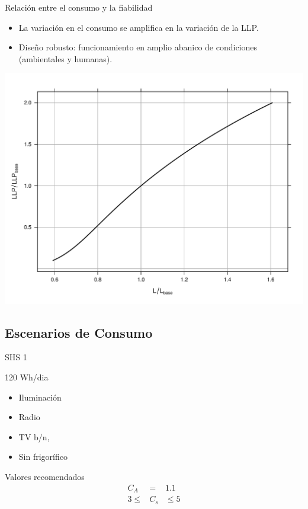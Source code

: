 \documentclass[xcolor={usenames,svgnames,dvipsnames}]{beamer}
\begin{document}
\begin{frame}[label={sec:orgadb8b8d}]{Relación entre el consumo y la fiabilidad}
\begin{itemize}
\item La variación en el consumo se amplifica en la variación de la LLP.
\item Diseño robusto: funcionamiento en amplio abanico de condiciones (ambientales y humanas).
\end{itemize}
\begin{center}
\includegraphics[height=0.7\textheight]{../figs/ConsumoLLP.pdf}
\end{center}
\end{frame}

\subsection{Escenarios de Consumo}
\label{sec:orge5a6fe3}
\begin{frame}[label={sec:org1bfdcab}]{SHS 1}
\begin{block}{120 Wh/dia}
\begin{itemize}
\item Iluminación

\item Radio

\item TV b/n,

\item Sin frigorífico
\end{itemize}
\end{block}

\begin{block}{Valores recomendados}
$$\begin{aligned}
C_{A} & = & 1.1\\
3\leq & C_{s} & \leq5
\end{aligned}$$
\end{block}
\end{frame}
\end{document}
